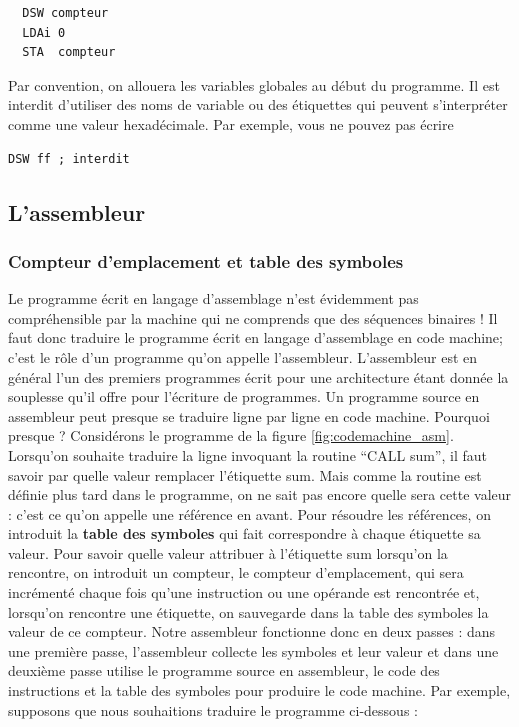  \begin{verbatim}
  DSW compteur
  LDAi 0
  STA  compteur
\end{verbatim}

Par convention, on allouera les variables globales au début du programme. Il est interdit d'utiliser des noms de variable ou des étiquettes qui peuvent s'interpréter comme une valeur hexadécimale. Par exemple, vous ne pouvez pas écrire

\begin{verbatim}
DSW ff ; interdit
\end{verbatim}

%




\subsection{L'assembleur}

\subsubsection{Compteur d'emplacement et table des symboles}

Le programme écrit en langage d'assemblage n'est évidemment pas compréhensible par la machine qui ne comprends que des séquences binaires ! Il faut donc traduire le programme écrit en langage d'assemblage en code machine; c'est le rôle d'un programme qu'on appelle l'assembleur. L'assembleur est en général l'un des premiers programmes écrit pour une architecture étant donnée la souplesse qu'il offre pour l'écriture de programmes. Un programme source en assembleur peut presque se traduire ligne par ligne en code machine. Pourquoi presque ? Considérons le programme de la figure \ref{fig:codemachine_asm}. Lorsqu'on souhaite traduire la ligne invoquant la routine ``CALL sum'', il faut savoir par quelle valeur remplacer l'étiquette sum. Mais comme la routine est définie plus tard dans le programme, on ne sait pas encore quelle sera cette valeur : c'est ce qu'on appelle une référence en avant. Pour résoudre les références, on introduit la \textbf{table des symboles} qui fait correspondre à chaque étiquette sa valeur. Pour savoir quelle valeur attribuer à l'étiquette sum lorsqu'on la rencontre, on introduit un compteur, le compteur d'emplacement, qui sera incrémenté chaque fois qu'une instruction ou une opérande est rencontrée et, lorsqu'on rencontre une étiquette, on sauvegarde dans la table des symboles la valeur de ce compteur. Notre assembleur fonctionne donc en deux passes : dans une première passe, l'assembleur collecte les symboles et leur valeur et dans une deuxième passe utilise le programme source en assembleur, le code des instructions et la table des symboles pour produire le code machine. Par exemple, supposons que nous souhaitions traduire le programme ci-dessous :

